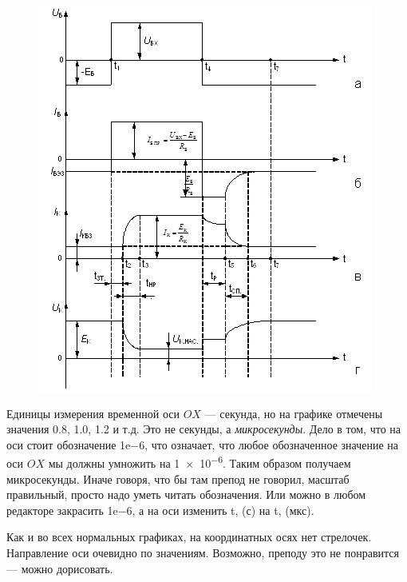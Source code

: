 \documentclass[a4paper,oneside,DIV=10,12pt]{scrartcl}
\begin{document}
		\begin{figure}[H]
			\centering
			\includegraphics[]{timediag.png}
			\label{fig:timediag} 
		\end{figure}
		
		Единицы измерения временной оси $OX$ — секунда, но на графике отмечены значения 0.8, 1.0, 1.2 и т.д. Это не секунды, а \emph{микросекунды}. Дело в том, что на оси стоит обозначение 1e−6, что означает, что любое обозначенное значение на оси $OX$ мы должны умножить на \num{1e-6}. Таким образом получаем микросекунды. Иначе говоря, что бы там препод не говорил, масштаб правильный, просто надо уметь читать обозначения. Или можно в любом редакторе закрасить 1e−6, а на оси изменить t, (с) на t, (мкс).
		
		Как и во всех нормальных графиках, на координатных осях нет стрелочек. Направление оси очевидно по значениям. Возможно, преподу это не понравится — можно дорисовать.
\end{document}
